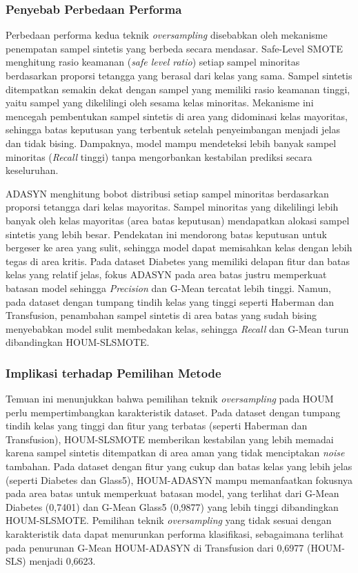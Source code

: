 \subsubsection{Penyebab Perbedaan Performa}
Perbedaan performa kedua teknik \textit{oversampling} disebabkan oleh mekanisme penempatan sampel sintetis yang berbeda secara mendasar. Safe-Level SMOTE menghitung rasio keamanan (\textit{safe level ratio}) setiap sampel minoritas berdasarkan proporsi tetangga yang berasal dari kelas yang sama. Sampel sintetis ditempatkan semakin dekat dengan sampel yang memiliki rasio keamanan tinggi, yaitu sampel yang dikelilingi oleh sesama kelas minoritas. Mekanisme ini mencegah pembentukan sampel sintetis di area yang didominasi kelas mayoritas, sehingga batas keputusan yang terbentuk setelah penyeimbangan menjadi jelas dan tidak bising. Dampaknya, model mampu mendeteksi lebih banyak sampel minoritas (\textit{Recall} tinggi) tanpa mengorbankan kestabilan prediksi secara keseluruhan. \par

ADASYN menghitung bobot distribusi setiap sampel minoritas berdasarkan proporsi tetangga dari kelas mayoritas. Sampel minoritas yang dikelilingi lebih banyak oleh kelas mayoritas (area batas keputusan) mendapatkan alokasi sampel sintetis yang lebih besar. Pendekatan ini mendorong batas keputusan untuk bergeser ke area yang sulit, sehingga model dapat memisahkan kelas dengan lebih tegas di area kritis. Pada dataset Diabetes yang memiliki delapan fitur dan batas kelas yang relatif jelas, fokus ADASYN pada area batas justru memperkuat batasan model sehingga \textit{Precision} dan G-Mean tercatat lebih tinggi. Namun, pada dataset dengan tumpang tindih kelas yang tinggi seperti Haberman dan Transfusion, penambahan sampel sintetis di area batas yang sudah bising menyebabkan model sulit membedakan kelas, sehingga \textit{Recall} dan G-Mean turun dibandingkan HOUM-SLSMOTE. \par

\subsubsection{Implikasi terhadap Pemilihan Metode}
Temuan ini menunjukkan bahwa pemilihan teknik \textit{oversampling} pada HOUM perlu mempertimbangkan karakteristik dataset. Pada dataset dengan tumpang tindih kelas yang tinggi dan fitur yang terbatas (seperti Haberman dan Transfusion), HOUM-SLSMOTE memberikan kestabilan yang lebih memadai karena sampel sintetis ditempatkan di area aman yang tidak menciptakan \textit{noise} tambahan. Pada dataset dengan fitur yang cukup dan batas kelas yang lebih jelas (seperti Diabetes dan Glass5), HOUM-ADASYN mampu memanfaatkan fokusnya pada area batas untuk memperkuat batasan model, yang terlihat dari G-Mean Diabetes (0,7401) dan G-Mean Glass5 (0,9877) yang lebih tinggi dibandingkan HOUM-SLSMOTE. Pemilihan teknik \textit{oversampling} yang tidak sesuai dengan karakteristik data dapat menurunkan performa klasifikasi, sebagaimana terlihat pada penurunan G-Mean HOUM-ADASYN di Transfusion dari 0,6977 (HOUM-SLS) menjadi 0,6623. \par


